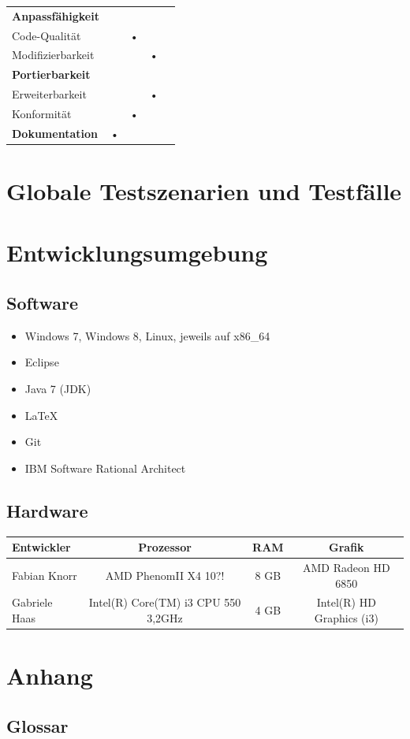 \documentclass[10pt]{scrreprt}
\begin{document}
\begin{center}
\begin{tabular}{lcccc}
\hline 
\rule[-1ex]{0pt}{4ex} \textbf{Anpassfähigkeit} &  &  &  &  \\ 
\rule[-1ex]{0pt}{4ex} \hspace{10pt} Code-Qualität & & • & & \\ 
\rule[-1ex]{0pt}{4ex} \hspace{10pt} Modifizierbarkeit & & & • & \\ 

\hline 
\rule[-1ex]{0pt}{4ex} \textbf{Portierbarkeit} &  &  &  &  \\ 
\rule[-1ex]{0pt}{4ex} \hspace{10pt} Erweiterbarkeit & & & • & \\ 
\rule[-1ex]{0pt}{4ex} \hspace{10pt} Konformität & & • & & \\ 

\hline 
\rule[-1ex]{0pt}{4ex} \textbf{Dokumentation} & • & & & \\ 
\hline 
\end{tabular} 
\end{center}




\chapter{Globale Testszenarien und Testfälle}





\chapter{Entwicklungsumgebung}
\section{Software}
\begin{itemize}
\item Windows 7, Windows 8, Linux, jeweils auf x86{\_}64
\item Eclipse
\item Java 7 (JDK)
\item \LaTeX
\item Git
\item IBM Software Rational Architect
\end{itemize}


\section{Hardware}
\begin{tabular}{l|c|c|c}
Entwickler & Prozessor & RAM & Grafik \\
\hline
Fabian Knorr & AMD PhenomII X4 10?! & 8 GB & AMD Radeon HD 6850 \\
Gabriele Haas & Intel(R) Core(TM) i3 CPU 550 3,2GHz & 4 GB & Intel(R) HD Graphics (i3) \\

\end{tabular}



\chapter{Anhang}
\section{Glossar}
\end{document}
